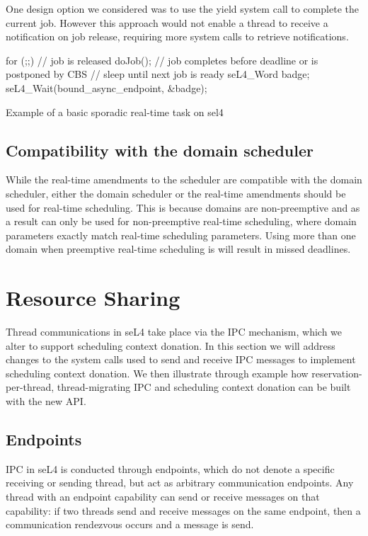 One design option we considered was to use the yield system call to complete the current job.
However this approach would not enable a thread to receive a notification on job release, requiring
more system calls to retrieve notifications.

\begin{listing}
\begin{ccode}
    for (;;) {
        // job is released
        doJob();
        // job completes before deadline or is postponed by CBS
        // sleep until next job is ready
        seL4_Word badge;
        seL4_Wait(bound_async_endpoint, &badge);
    }
\end{ccode}
\caption{Example of a basic sporadic real-time task on sel4}
\label{list:sporadic-sel4}
\end{listing}

\subsection{Compatibility with the domain scheduler}

While the real-time amendments to the scheduler are compatible with the domain scheduler, either the domain scheduler or the real-time amendments should be used for real-time scheduling.
This is because domains are non-preemptive and as a result can only be used for non-preemptive real-time scheduling, where domain parameters exactly match real-time scheduling parameters.
Using more than one domain when preemptive real-time scheduling is will result in missed deadlines.



\section{Resource Sharing}

Thread communications in seL4 take place via the IPC mechanism, which we alter to support scheduling context donation.
In this section we will address changes to the system calls used to send and receive IPC messages to implement scheduling context donation.
We then illustrate through example how reservation-per-thread, thread-migrating IPC and scheduling context donation can be built with the new \gls{API}.

\subsection{Endpoints}

\Gls{IPC} in seL4 is conducted through endpoints, which do not denote a specific receiving or sending thread, but act as arbitrary communication endpoints.
Any thread with an endpoint capability can send or receive messages on that capability: if two threads send and receive messages on the same endpoint, then a communication rendezvous occurs and a message is send.

